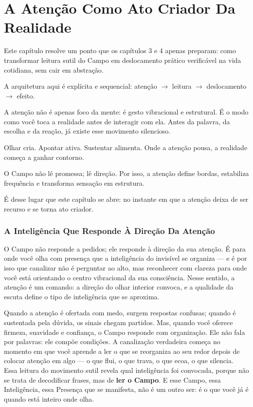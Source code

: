 \documentclass[12pt]{book}
\begin{document}
\chapter{A Atenção Como Ato Criador Da Realidade}

Este capítulo resolve um ponto que os capítulos 3 e 4 apenas preparam: como transformar leitura sutil do Campo em deslocamento prático verificável na vida cotidiana, sem cair em abstração.

A arquitetura aqui é explícita e sequencial: atenção $\rightarrow$ leitura $\rightarrow$ deslocamento $\rightarrow$ efeito.

A atenção não é apenas foco da mente: é gesto vibracional e estrutural. É o modo como você toca a realidade antes de interagir com ela. Antes da palavra, da escolha e da reação, já existe esse movimento silencioso.

Olhar cria. Apontar ativa. Sustentar alimenta. Onde a atenção pousa, a realidade começa a ganhar contorno.

O Campo não lê promessa; lê direção. Por isso, a atenção define bordas, estabiliza frequência e transforma sensação em estrutura.

É desse lugar que este capítulo se abre: no instante em que a atenção deixa de ser recurso e se torna ato criador.




\subsection*{A Inteligência Que Responde À Direção Da Atenção}

O Campo não responde a pedidos; ele responde à direção da sua atenção. É para onde você olha com presença que a inteligência do invisível se organiza — e é por isso que canalizar não é perguntar ao alto, mas reconhecer com clareza para onde você está orientando o centro vibracional da sua consciência. Nesse sentido, a atenção é um comando: a direção do olhar interior convoca, e a qualidade da escuta define o tipo de inteligência que se aproxima.

Quando a atenção é ofertada com medo, surgem respostas confusas; quando é sustentada pela dúvida, os sinais chegam partidos. Mas, quando você oferece firmeza, suavidade e confiança, o Campo responde com organização. Ele não fala por palavras: ele compõe condições. A canalização verdadeira começa no momento em que você aprende a ler o que se reorganiza ao seu redor depois de colocar atenção em algo — o que flui, o que trava, o que ecoa, o que silencia. Essa leitura do movimento sutil revela qual inteligência foi convocada, porque não se trata de decodificar frases, mas de \textbf{ler o Campo}. E esse Campo, essa Inteligência, essa Presença que se manifesta, não é um outro ser: é o que você já é quando está inteiro onde olha.
\end{document}
